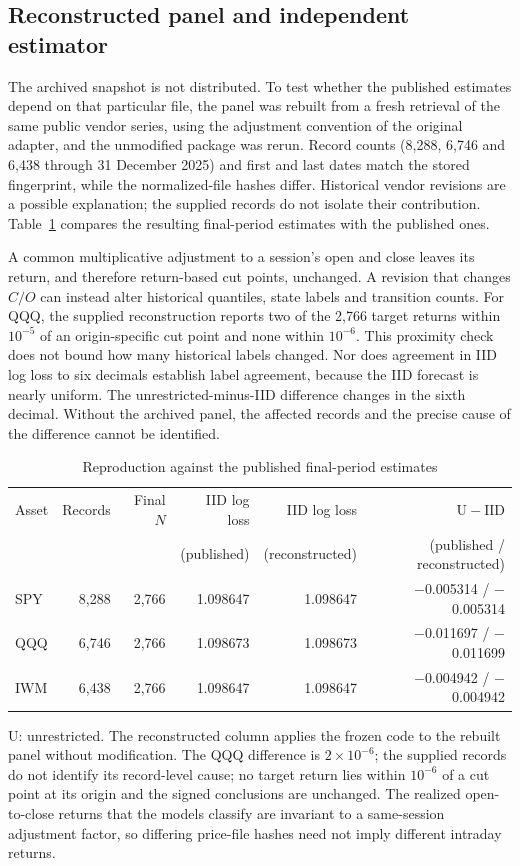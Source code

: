 \subsection{Reconstructed panel and independent estimator}\label{app:reconstruction}
The archived snapshot is not distributed. To test whether the published estimates depend on that particular file, the panel was rebuilt from a fresh retrieval of the same public vendor series, using the adjustment convention of the original adapter, and the unmodified package was rerun. Record counts (8,288, 6,746 and 6,438 through 31 December 2025) and first and last dates match the stored fingerprint, while the normalized-file hashes differ. Historical vendor revisions are a possible explanation; the supplied records do not isolate their contribution. Table~\ref{tab:repro} compares the resulting final-period estimates with the published ones.

A common multiplicative adjustment to a session's open and close leaves its return, and therefore return-based cut points, unchanged. A revision that changes $C/O$ can instead alter historical quantiles, state labels and transition counts. For QQQ, the supplied reconstruction reports two of the 2,766 target returns within $10^{-5}$ of an origin-specific cut point and none within $10^{-6}$. This proximity check does not bound how many historical labels changed. Nor does agreement in IID log loss to six decimals establish label agreement, because the IID forecast is nearly uniform. The unrestricted-minus-IID difference changes in the sixth decimal. Without the archived panel, the affected records and the precise cause of the difference cannot be identified.

\begin{table}[!htbp]\centering\small\setlength{\tabcolsep}{7pt}
\caption{Reproduction against the published final-period estimates}\label{tab:repro}
\begin{tabular}{lrrrrr}\toprule
Asset & Records & Final $N$ & IID log loss & IID log loss & $\mathrm{U}-\mathrm{IID}$\\
 & & & (published) & (reconstructed) & (published / reconstructed)\\\midrule
SPY & 8,288 & 2,766 & 1.098647 & 1.098647 & $-$0.005314 / $-$0.005314\\
QQQ & 6,746 & 2,766 & 1.098673 & 1.098673 & $-$0.011697 / $-$0.011699\\
IWM & 6,438 & 2,766 & 1.098647 & 1.098647 & $-$0.004942 / $-$0.004942\\
\bottomrule\end{tabular}
\par\smallskip\parbox{0.98\linewidth}{\footnotesize U: unrestricted. The reconstructed column applies the frozen code to the rebuilt panel without modification. The QQQ difference is $2\times10^{-6}$; the supplied records do not identify its record-level cause; no target return lies within $10^{-6}$ of a cut point at its origin and the signed conclusions are unchanged. The realized open-to-close returns that the models classify are invariant to a same-session adjustment factor, so differing price-file hashes need not imply different intraday returns.}
\end{table}

